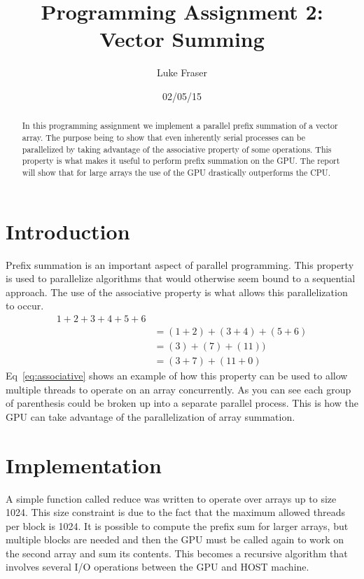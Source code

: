 \documentclass[letterpaper,twocolumn]{article}
\author{Luke Fraser}
\title{Programming Assignment 2: \\ Vector Summing}
\date{02/05/15}
\begin{document}
\maketitle
\begin{abstract}
  In this programming assignment we implement a parallel prefix summation of a vector array. The purpose being to show that even inherently serial processes can be parallelized by taking advantage of the associative property of some operations. This property is what makes it useful to perform prefix summation on the GPU. The report will show that for large arrays the use of the GPU drastically outperforms the CPU.
\end{abstract}

\section{Introduction}
Prefix summation is an important aspect of parallel programming. This property is used to parallelize algorithms that would otherwise seem bound to a sequential approach. The use of the associative property is what allows this parallelization to occur. 
\begin{equation}
\begin{split}
  1+2+3+4+5+6 \\ 
  &=(1+2)+(3+4)+(5+6) \\
  &=(3)+(7)+(11)) \\
  &=(3+7)+(11+0)
  \label{eq:associative}
\end{split}
\end{equation}
Eq~\ref{eq:associative} shows an example of how this property can be used to allow multiple threads to operate on an array concurrently. As you can see each group of parenthesis could be broken up into a separate parallel process. This is how the GPU can take advantage of the parallelization of array summation.

\section{Implementation}
A simple function called reduce was written to operate over arrays up to size 1024. This size constraint is due to the fact that the maximum allowed threads per block is 1024. It is possible to compute the prefix sum for larger arrays, but multiple blocks are needed and then the GPU must be called again to work on the second array and sum its contents. This becomes a recursive algorithm that involves several I/O operations between the GPU and HOST machine.
\end{document}
